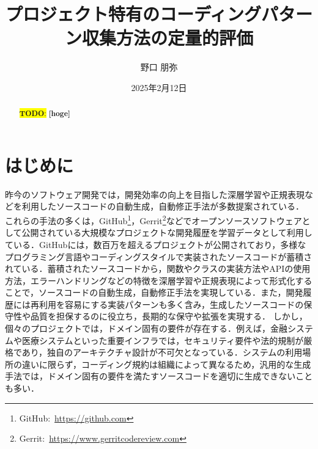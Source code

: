 \documentclass[11pt]{jreport}
\title{プロジェクト特有のコーディングパターン収集方法の定量的評価}
\author{野口 朋弥}
\date{2025年2月12日}	%
\newcommand{\todo}[1]{\colorbox{yellow}{{\bf TODO}:}{\color{red} {\textbf{[#1]}}}}
\begin{document}
\maketitle

\begin{abstract}
\todo{hoge}

\end{abstract}

\tableofcontents



\newpage
{}	%


\chapter{はじめに}
昨今のソフトウェア開発では，開発効率の向上を目指した深層学習や正規表現などを利用したソースコードの自動生成，自動修正手法が多数提案されている\cite{deep_learnnig1}\cite{deep_learning2}\cite{deep_learnnig3}\cite{deep_learnning4}．
これらの手法の多くは，GitHub\footnote{GitHub:~\url{https://github.com}}，Gerrit\footnote{Gerrit:~\url{https://www.gerritcodereview.com}}などでオープンソースソフトウェアとして公開されている大規模なプロジェクトな開発履歴を学習データとして利用している．GitHubには，数百万を超えるプロジェクトが公開されており，多様なプログラミング言語やコーディングスタイルで実装されたソースコードが蓄積されている．蓄積されたソースコードから，関数やクラスの実装方法やAPIの使用方法，エラーハンドリングなどの特徴を深層学習や正規表現によって形式化することで，ソースコードの自動生成，自動修正手法を実現している．また，開発履歴には再利用を容易にする実装パターンも多く含み，生成したソースコードの保守性や品質を担保するのに役立ち，長期的な保守や拡張を実現する．
しかし，個々のプロジェクトでは，ドメイン固有の要件が存在する．例えば，金融システムや医療システムといった重要インフラでは，セキュリティ要件や法的規制が厳格であり，独自のアーキテクチャ設計が不可欠となっている\cite{finacial}\cite{financial2}\cite{medical}．システムの利用場所の違いに限らず，コーディング規約は組織によって異なるため，汎用的な生成手法では，ドメイン固有の要件を満たすソースコードを適切に生成できないことも多い．
\end{document}
